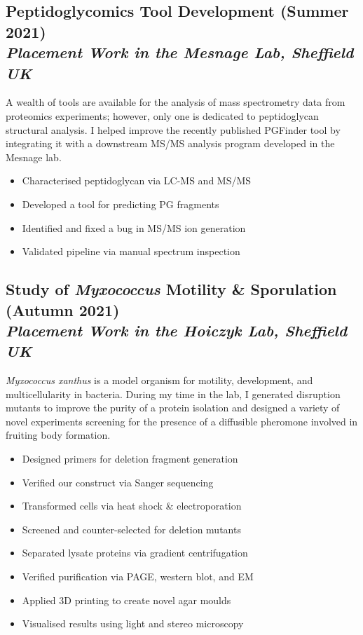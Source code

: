 \documentclass[twocolumn, a4paper, fontsize=9pt, headsepline, footsepline]{scrartcl}
\begin{document}
\subsection*{Peptidoglycomics Tool Development (Summer 2021)\\\textmd{\emph{Placement Work
    in the Mesnage Lab, Sheffield UK}}}
\noindent
A wealth of tools are available for the analysis of mass spectrometry data from
proteomics experiments; however, only one is dedicated to peptidoglycan
structural analysis. I helped improve the recently published PGFinder tool by
integrating it with a downstream MS/MS analysis program developed in the Mesnage
lab.
\begin{itemize}
\item Characterised peptidoglycan via LC-MS and MS/MS
\item Developed a tool for predicting PG fragments
\item Identified and fixed a bug in MS/MS ion generation
\item Validated pipeline via manual spectrum inspection
\end{itemize}

\subsection*{Study of \emph{Myxococcus} Motility \& Sporulation (Autumn 2021)\\\textmd{\emph{Placement Work
    in the Hoiczyk Lab, Sheffield UK}}}
\noindent
\emph{Myxococcus xanthus} is a model organism for motility, development, and
multicellularity in bacteria. During my time in the lab, I generated disruption
mutants to improve the purity of a protein isolation and designed a variety of
novel experiments screening for the presence of a diffusible pheromone involved
in fruiting body formation.
\begin{itemize}
\item Designed primers for deletion fragment generation
\item Verified our construct via Sanger sequencing
\item Transformed cells via heat shock \& electroporation
\item Screened and counter-selected for deletion mutants
\item Separated lysate proteins via gradient centrifugation
\item Verified purification via PAGE, western blot, and EM
\item Applied 3D printing to create novel agar moulds
\item Visualised results using light and stereo microscopy
\end{itemize}
\end{document}
